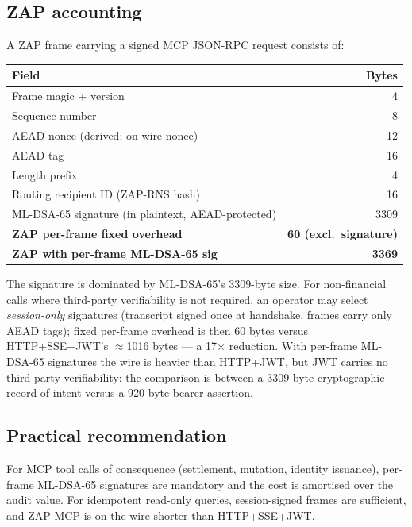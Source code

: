 \documentclass[11pt,a4paper]{article}
\theoremstyle{definition}
\theoremstyle{remark}
\newcommand{\zap}{\textsf{ZAP}\xspace}
\newcommand{\zapmcp}{\textsf{ZAP-MCP}\xspace}
\newcommand{\mcp}{\textsf{MCP}\xspace}
\newcommand{\rns}{\textsf{ZAP-RNS}\xspace}
\begin{document}
\subsection{\zap{} accounting}

A \zap{} frame carrying a signed \mcp{} JSON-RPC request consists of:

\begin{table}[h]
\centering
\small
\begin{tabular}{lr}
\toprule
\textbf{Field} & \textbf{Bytes} \\
\midrule
Frame magic + version                                  & 4 \\
Sequence number                                        & 8 \\
AEAD nonce (derived; on-wire nonce)                    & 12 \\
AEAD tag                                               & 16 \\
Length prefix                                          & 4 \\
Routing recipient ID (\rns{} hash)                     & 16 \\
ML-DSA-65 signature (in plaintext, AEAD-protected)     & 3309 \\
\midrule
\textbf{\zap{} per-frame fixed overhead}        & \textbf{60 (excl.\ signature)} \\
\textbf{\zap{} with per-frame ML-DSA-65 sig}    & \textbf{3369} \\
\bottomrule
\end{tabular}
\end{table}

The signature is dominated by ML-DSA-65's 3309-byte size. For
non-financial calls where third-party verifiability is not required, an
operator may select \emph{session-only} signatures (transcript signed
once at handshake, frames carry only AEAD tags); fixed per-frame
overhead is then 60 bytes versus HTTP+SSE+JWT's $\approx$1016 bytes ---
a 17$\times$ reduction. With per-frame ML-DSA-65 signatures the wire is
heavier than HTTP+JWT, but JWT carries no third-party verifiability:
the comparison is between a 3309-byte cryptographic record of intent
versus a 920-byte bearer assertion.

\subsection{Practical recommendation}

For \mcp{} tool calls of consequence (settlement, mutation, identity
issuance), per-frame ML-DSA-65 signatures are mandatory and the
cost is amortised over the audit value. For idempotent read-only
queries, session-signed frames are sufficient, and \zapmcp{} is on the
wire shorter than HTTP+SSE+JWT.
\end{document}
